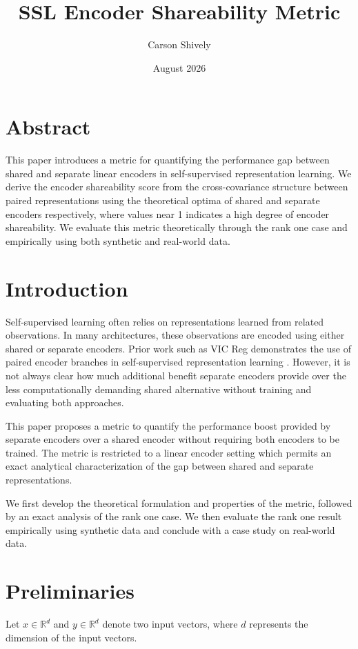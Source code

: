 \documentclass{article}
\title{SSL Encoder Shareability Metric}
\author{Carson Shively}
\date{August 2026}
\begin{document}
\maketitle
\section{Abstract}
This paper introduces a metric for quantifying the performance gap between shared and separate linear encoders in self-supervised representation learning. We derive the encoder shareability score from the cross-covariance structure between paired representations using the theoretical optima of shared and separate encoders respectively, where values near 1 indicates a high degree of encoder shareability. We evaluate this metric theoretically through the rank one case and empirically using both synthetic and real-world data.

\section{Introduction}

Self-supervised learning often relies on representations learned from related observations. In many architectures, these observations are encoded using either shared or separate encoders. Prior work such as VIC Reg demonstrates the use of paired encoder branches in self-supervised representation learning \cite{vicreg}. However, it is not always clear how much additional benefit separate encoders provide over the less computationally demanding shared alternative without training and evaluating both approaches.

This paper proposes a metric to quantify the performance boost provided by separate encoders over a shared encoder without requiring both encoders to be trained. The metric is restricted to a linear encoder setting which permits an exact analytical characterization of the gap between shared and separate representations.

We first develop the theoretical formulation and properties of the metric, followed by an exact analysis of the rank one case. We then evaluate the rank one result empirically using synthetic data and conclude with a case study on real-world data.

\section{Preliminaries}
Let \(x \in \mathbb{R}^d\) and \(y \in \mathbb{R}^d\) denote two input vectors, where \(d\) represents the dimension of the input vectors.
\end{document}
